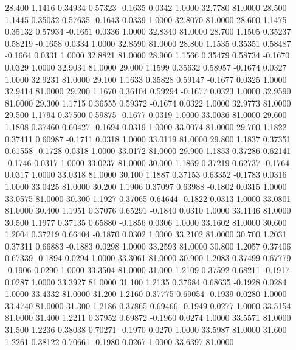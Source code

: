   28.400   1.1416   0.34934   0.57323  -0.1635   0.0342   1.0000  32.7780  81.0000
  28.500   1.1445   0.35032   0.57635  -0.1643   0.0339   1.0000  32.8070  81.0000
  28.600   1.1475   0.35132   0.57934  -0.1651   0.0336   1.0000  32.8340  81.0000
  28.700   1.1505   0.35237   0.58219  -0.1658   0.0334   1.0000  32.8590  81.0000
  28.800   1.1535   0.35351   0.58487  -0.1664   0.0331   1.0000  32.8821  81.0000
  28.900   1.1566   0.35479   0.58734  -0.1670   0.0329   1.0000  32.9034  81.0000
  29.000   1.1599   0.35632   0.58957  -0.1674   0.0327   1.0000  32.9231  81.0000
  29.100   1.1633   0.35828   0.59147  -0.1677   0.0325   1.0000  32.9414  81.0000
  29.200   1.1670   0.36104   0.59294  -0.1677   0.0323   1.0000  32.9590  81.0000
  29.300   1.1715   0.36555   0.59372  -0.1674   0.0322   1.0000  32.9773  81.0000
  29.500   1.1794   0.37500   0.59875  -0.1677   0.0319   1.0000  33.0036  81.0000
  29.600   1.1808   0.37460   0.60427  -0.1694   0.0319   1.0000  33.0074  81.0000
  29.700   1.1822   0.37411   0.60987  -0.1711   0.0318   1.0000  33.0119  81.0000
  29.800   1.1837   0.37351   0.61558  -0.1728   0.0318   1.0000  33.0172  81.0000
  29.900   1.1853   0.37286   0.62141  -0.1746   0.0317   1.0000  33.0237  81.0000
  30.000   1.1869   0.37219   0.62737  -0.1764   0.0317   1.0000  33.0318  81.0000
  30.100   1.1887   0.37153   0.63352  -0.1783   0.0316   1.0000  33.0425  81.0000
  30.200   1.1906   0.37097   0.63988  -0.1802   0.0315   1.0000  33.0575  81.0000
  30.300   1.1927   0.37065   0.64644  -0.1822   0.0313   1.0000  33.0801  81.0000
  30.400   1.1951   0.37076   0.65291  -0.1840   0.0310   1.0000  33.1146  81.0000
  30.500   1.1977   0.37135   0.65880  -0.1856   0.0306   1.0000  33.1602  81.0000
  30.600   1.2004   0.37219   0.66404  -0.1870   0.0302   1.0000  33.2102  81.0000
  30.700   1.2031   0.37311   0.66883  -0.1883   0.0298   1.0000  33.2593  81.0000
  30.800   1.2057   0.37406   0.67339  -0.1894   0.0294   1.0000  33.3061  81.0000
  30.900   1.2083   0.37499   0.67779  -0.1906   0.0290   1.0000  33.3504  81.0000
  31.000   1.2109   0.37592   0.68211  -0.1917   0.0287   1.0000  33.3927  81.0000
  31.100   1.2135   0.37684   0.68635  -0.1928   0.0284   1.0000  33.4332  81.0000
  31.200   1.2160   0.37775   0.69054  -0.1939   0.0280   1.0000  33.4740  81.0000
  31.300   1.2186   0.37865   0.69466  -0.1949   0.0277   1.0000  33.5154  81.0000
  31.400   1.2211   0.37952   0.69872  -0.1960   0.0274   1.0000  33.5571  81.0000
  31.500   1.2236   0.38038   0.70271  -0.1970   0.0270   1.0000  33.5987  81.0000
  31.600   1.2261   0.38122   0.70661  -0.1980   0.0267   1.0000  33.6397  81.0000
